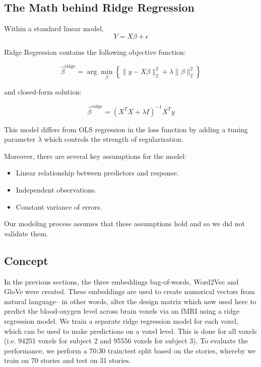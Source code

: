 \documentclass[12pt,letterpaper]{article}
\begin{document}
\subsection{The Math behind Ridge Regression}

Within a standard linear model, 
\begin{equation}
Y = X\beta + \epsilon
\end{equation}

Ridge Regression contains the following objective function: 

\begin{equation}
\hat{\beta}^{\text{ridge}} = \arg\min_\beta \left\{ \|y - X\beta\|_2^2 + \lambda \|\beta\|_2^2 \right\} 
\end{equation}

and closed-form solution: 

\begin{equation}
\hat{\beta}^{ridge} = (X^TX + \lambda I)^{-1}X^Ty
\end{equation}

This model differs from OLS regression in the loss function by adding a tuning parameter $\lambda$ which controls the strength of regularization. 

Moreover, there are several key assumptions for the model:  
\begin{itemize}[label=\textbullet, itemsep=0.2cm]

   \item Linear relationship between predictors and response.
   
   \item Independent observations.
   
   \item Constant variance of errors.
 
\end{itemize}

Our modeling process assumes that these assumptions hold and so we did not validate them.  


\subsection{Concept}

In the previous sections, the three embeddings bag-of-words, Word2Vec and GloVe were created. These embeddings are used to create numerical vectors from natural language-- in other words, alter the design matrix which now used here to predict the blood-oxygen level across brain voxels via an fMRI using a ridge regression model. We train a separate ridge regression model for each voxel, which can be used to make predictions on a voxel level. This is done for all voxels (i.e. 94251 voxels for subject 2 and 95556 voxels for subject 3). To evaluate the performance, we perform a 70:30 train:test split based on the stories, whereby we train on 70 stories and test on 31 stories.
\end{document}
